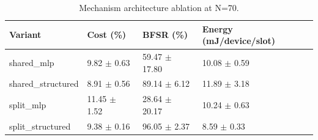 \begin{table}[t]
\centering
\caption{Mechanism architecture ablation at N=70.}
\label{tab:mechanism}
\begin{tabular}{llll}
\toprule
Variant & Cost (\%) & BFSR (\%) & Energy (mJ/device/slot) \\
\midrule
shared_mlp & 9.82 $\pm$ 0.63 & 59.47 $\pm$ 17.80 & 10.08 $\pm$ 0.59 \\
shared_structured & 8.91 $\pm$ 0.56 & 89.14 $\pm$ 6.12 & 11.89 $\pm$ 3.18 \\
split_mlp & 11.45 $\pm$ 1.52 & 28.64 $\pm$ 20.17 & 10.24 $\pm$ 0.63 \\
split_structured & 9.38 $\pm$ 0.16 & 96.05 $\pm$ 2.37 & 8.59 $\pm$ 0.33 \\
\bottomrule
\end{tabular}
\end{table}

